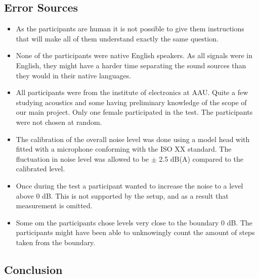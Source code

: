 \subsection{Error Sources}
\begin{itemize}
\item As the participants are human it is not possible to give them instructions that will make all of them understand exactly the same question. 
\item None of the participants were native English speakers. As all signals were in English, they might have a harder time separating the sound sources than they would in their native languages. 
\item All participants were from the institute of electronics at AAU. Quite a few studying acoustics and some having preliminary knowledge of the scope of our main project. Only one female participated in the test. The participants were not chosen at random. 
\item The calibration of the overall noise level was done using a model head with fitted with a microphone conforming with the ISO XX standard. The fluctuation in noise level was allowed to be $\pm$ 2.5 dB(A) compared to the calibrated level. 
\item Once during the test a participant wanted to increase the noise to a level above 0 dB. This is not supported by the setup, and as a result that measurement is omitted.
\item Some om the participants chose levels very close to the boundary 0 dB. The participants might have been able to unknowingly count the amount of steps taken from the boundary.  
\end{itemize}

\subsection{Conclusion}


